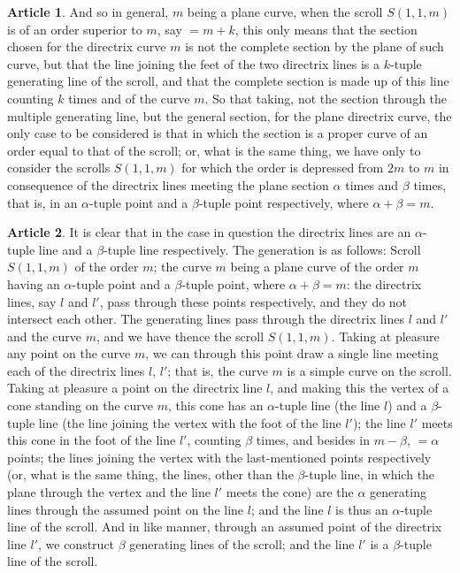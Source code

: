 \documentclass[12pt,a4paper]{article}
\theoremstyle{definition}
\newtheorem{art}{Article}[section]
\begin{document}
\begin{art}
And so in general, $m$ being a plane curve, when the scroll $S(1, 1, m)$ is of an order superior to $m$, say $= m + k$, this only means that the section chosen for the directrix curve $m$ is not the complete section by the plane of such curve, but that the line joining the feet of the two directrix lines is a $k$-tuple generating line of the scroll, and that the complete section is made up of this line counting $k$ times and of the curve $m$. So that taking, not the section through the multiple generating line, but the general section, for the plane directrix curve, the only case to be considered is that in which the section is a proper curve of an order equal to that of the scroll; or, what is the same thing, we have only to consider the scrolls $S(1, 1, m)$ for which the order is depressed from $2m$ to $m$ in consequence of the directrix lines meeting the plane section $\alpha$ times and $\beta$ times, that is, in an $\alpha$-tuple point and a $\beta$-tuple point respectively, where $\alpha + \beta = m$.
\end{art}

\begin{art}
It is clear that in the case in question the directrix lines are an $\alpha$-tuple line and a $\beta$-tuple line respectively. The generation is as follows: Scroll $S(1, 1, m)$ of the order $m$; the curve $m$ being a plane curve of the order $m$ having an $\alpha$-tuple point and a $\beta$-tuple point, where $\alpha + \beta = m$: the directrix lines, say $l$ and $l'$, pass through these points respectively, and they do not intersect each other. The generating lines pass through the directrix lines $l$ and $l'$ and the curve $m$, and we have thence the scroll $S(1, 1, m)$. Taking at pleasure any point on the curve $m$, we can through this point draw a single line meeting each of the directrix lines $l$, $l'$; that is, the curve $m$ is a simple curve on the scroll. Taking at pleasure a point on the directrix line $l$, and making this the vertex of a cone standing on the curve $m$, this cone has an $\alpha$-tuple line (the line $l$) and a $\beta$-tuple line (the line joining the vertex with the foot of the line $l'$); the line $l'$ meets this cone in the foot of the line $l'$, counting $\beta$ times, and besides in $m - \beta$, $= \alpha$ points; the lines joining the vertex with the last-mentioned points respectively (or, what is the same thing, the lines, other than the $\beta$-tuple line, in which the plane through the vertex and the line $l'$ meets the cone) are the $\alpha$ generating lines through the assumed point on the line $l$; and the line $l$ is thus an $\alpha$-tuple line of the scroll. And in like manner, through an assumed point of the directrix line $l'$, we construct $\beta$ generating lines of the scroll; and the line $l'$ is a $\beta$-tuple line of the scroll.
\end{art}
\end{document}
